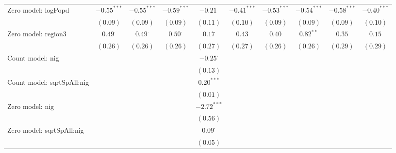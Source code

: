 \begin{center}
\begin{longtable}{l c c c c c c c c c}
Zero model: logPopd            & $-0.55^{***}$  & $-0.55^{***}$  & $-0.59^{***}$  & $-0.21^{\cdot}$ & $-0.41^{***}$  & $-0.53^{***}$   & $-0.54^{***}$   & $-0.58^{***}$   & $-0.40^{***}$  \\
                               & $(0.09)$       & $(0.09)$       & $(0.09)$       & $(0.11)$        & $(0.10)$       & $(0.09)$        & $(0.09)$        & $(0.09)$        & $(0.10)$       \\
Zero model: region3            & $0.49^{\cdot}$ & $0.49^{\cdot}$ & $0.50^{\cdot}$ & $0.17$          & $0.43$         & $0.40$          & $0.82^{**}$     & $0.35$          & $0.15$         \\
                               & $(0.26)$       & $(0.26)$       & $(0.26)$       & $(0.27)$        & $(0.27)$       & $(0.26)$        & $(0.26)$        & $(0.29)$        & $(0.29)$       \\
Count model: nig               &                &                &                & $-0.25^{\cdot}$ &                &                 &                 &                 &                \\
                               &                &                &                & $(0.13)$        &                &                 &                 &                 &                \\
Count model: sqrtSpAll:nig     &                &                &                & $0.20^{***}$    &                &                 &                 &                 &                \\
                               &                &                &                & $(0.01)$        &                &                 &                 &                 &                \\
Zero model: nig                &                &                &                & $-2.72^{***}$   &                &                 &                 &                 &                \\
                               &                &                &                & $(0.56)$        &                &                 &                 &                 &                \\
Zero model: sqrtSpAll:nig      &                &                &                & $0.09^{\cdot}$  &                &                 &                 &                 &                \\
                               &                &                &                & $(0.05)$        &                &                 &                 &                 &                \\

\end{longtable}
\end{center}
